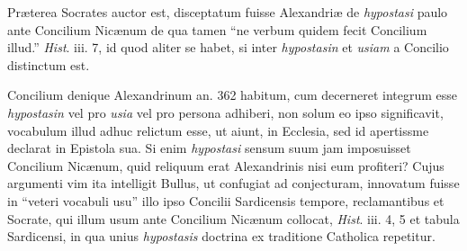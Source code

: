Præterea
Socrates auctor est, disceptatum fuisse Alexandriæ de \emph{hypostasi}
paulo ante Concilium Nicænum de qua tamen ``ne verbum quidem fecit
Concilium illud.'' \emph{Hist}. iii. 7, id quod aliter se habet, si
inter \emph{hypostasin} et \emph{usiam} a Concilio distinctum est.

Concilium
denique Alexandrinum an. 362 habitum, cum decerneret integrum esse \emph{hypostasin}
vel pro \emph{usia} vel pro persona adhiberi, non solum eo ipso
significavit, vocabulum illud adhuc relictum esse, ut aiunt, in
Ecclesia, sed id apertissme declarat in Epistola sua. Si enim \emph{hypostasi}
sensum suum jam imposuisset Concilium Nicænum, quid reliquum erat
Alexandrinis nisi eum profiteri? Cujus argumenti vim ita intelligit
Bullus, ut confugiat ad conjecturam, innovatum fuisse in ``veteri
vocabuli usu'' illo ipso Concilii Sardicensis tempore, reclamantibus et
Socrate, qui illum usum ante Concilium Nicænum collocat, \emph{Hist}.
iii. 4, 5 et tabula Sardicensi, in qua unius \emph{hypostasis}
doctrina ex traditione Catholica repetitur.

